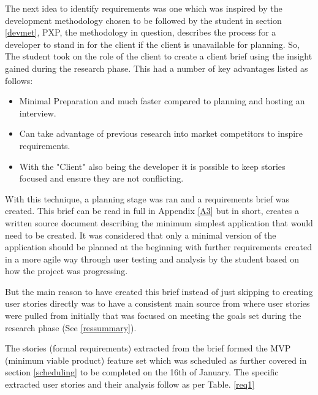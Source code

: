 The next idea to identify requirements was one which was inspired by the development methodology chosen to be followed by the student in section \ref{devmet}, PXP, the methodology in question, describes the process for a developer to stand in for the client if the client is unavailable for planning. So, The student took on the role of the client to create a client brief using the insight gained during the research phase. This had a number of key advantages listed as follows:

\begin{itemize}
    \item Minimal Preparation and much faster compared to planning and hosting an interview.
    \item Can take advantage of previous research into market competitors to inspire requirements.
    \item With the "Client" also being the developer it is possible to keep stories focused and ensure they are not conflicting.
\end{itemize}

With this technique, a planning stage was ran and a requirements brief was created. This brief can be read in full in Appendix \ref{A3} but in short, creates a written source document describing the minimum simplest application that would need to be created. It was considered that only a minimal version of the application should be planned at the beginning with further requirements created in a more agile way through user testing and analysis by the student based on how the project was progressing.

But the main reason to have created this brief instead of just skipping to creating user stories directly was to have a consistent main source from where user stories were pulled from initially that was focused on meeting the goals set during the research phase (See \ref{ressummary}).

The stories (formal requirements) extracted from the brief formed the MVP (minimum viable product) feature set which was scheduled as further covered in section \ref{scheduling} to be completed on the 16th of January. The specific extracted user stories and their analysis follow as per Table. \ref{req1}

